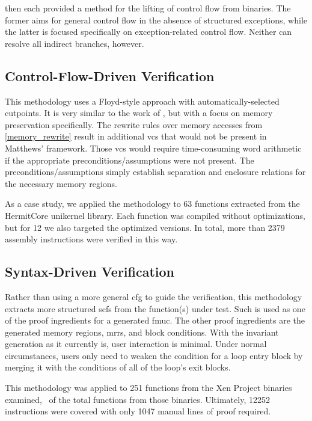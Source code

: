  then each provided a method for the lifting of control flow from binaries.
The former aims for general control flow in the absence of structured exceptions, while the latter is focused specifically on exception-related control flow.
Neither can resolve all indirect branches, however.

\subsection{Control-Flow-Driven Verification}
This methodology uses a Floyd-style approach \autocite{floyd1967assigning}
with automatically-selected cutpoints.
It is very similar to the work of \textcite{matthews2006verification},
but with a focus on memory preservation specifically.
The rewrite rules over memory accesses from \cref{memory_rewrite}
result in additional \acp{vc} that would not be present in Matthews' framework.
Those \acp{vc} would require time-consuming word arithmetic if the appropriate preconditions/assumptions were not present.
The preconditions/assumptions simply establish separation and enclosure relations for the necessary memory regions.

As a case study, we applied the methodology to \num{63} functions extracted from the HermitCore unikernel library.
Each function was compiled without optimizations, but for \num{12} we also targeted the optimized versions.
In total, more than \num{2379} assembly instructions were verified in this way.

\subsection{Syntax-Driven Verification}
Rather than using a more general \ac{cfg} to guide the verification,
this methodology extracts more structured \acp{scf} from the function(s) under test.
Such  is used as one of the proof ingredients for a generated \ac{fmuc}.
The other proof ingredients are the generated memory regions, \acp{mrr}, and block conditions.
With the invariant generation as it currently is, user interaction is minimal.
Under normal circumstances, users only need to weaken the condition for a loop entry block by merging it with the conditions of all of the loop's exit blocks.

This methodology was applied to \num{251} functions from the Xen Project binaries examined, \xenpercentage\ of the total functions from those binaries.
Ultimately, \num{12252} instructions were covered with only \num{1047} manual lines of proof required.

